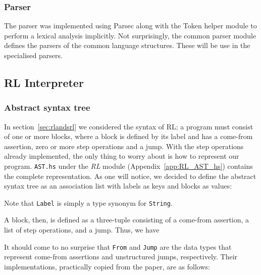 
\subsubsection{Parser}
The parser was implemented using Parsec along with the Token helper module to perform a lexical analysis implicitly. Not surprisingly, the common parser module defines the parsers of the common language structures. These will be use in the specialised parsers.





\subsection{RL Interpreter}

\subsubsection{Abstract syntax tree}

In section~\ref{sec:rlandsrl} we considered the syntax of RL; a program must consist of one or more blocks, where a block is defined by its label and has a come-from assertion, zero or more step operations and a jump. With the step operations already implemented, the only thing to worry about is how to represent our program. \texttt{AST.hs} under the \textit{RL} module (Appendix~\ref{app:RL_AST_hs}) contains the complete representation. As one will notice, we decided to define the abstract syntax tree as an association list with labels as keys and blocks as values:

Note that \texttt{Label} is simply a type synonym for \texttt{String}.

A block, then, is defined as a three-tuple consisting of a come-from assertion, a list of step operations, and a jump. Thus, we have

It should come to no surprise that \texttt{From} and \texttt{Jump} are the data types that represent come-from assertions and unstructured jumps, respectively. Their implementations, practically copied from the paper, are as follows:
\begin{figure}[H]
  \centering
\begin{subfigure}{0.45\textwidth}
  
\end{subfigure}
\qquad
\begin{subfigure}{0.45\textwidth}
  
\end{subfigure}
\end{figure}

